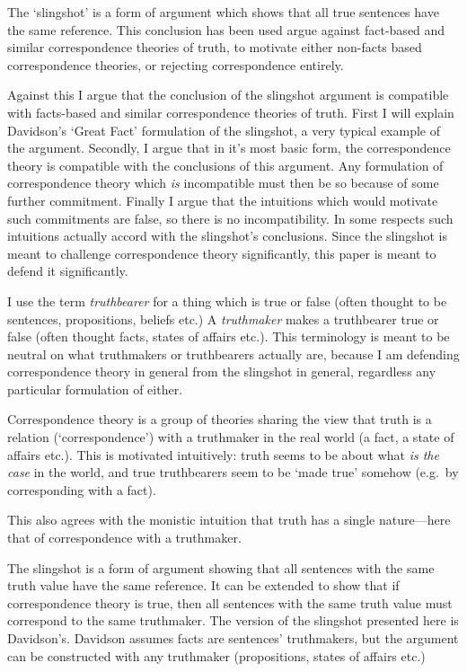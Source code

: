 The `slingshot' is a form of argument which shows that all true sentences have the same reference.
This conclusion has been used argue against fact-based and similar correspondence theories of truth, to motivate either non-facts based correspondence theories, or rejecting correspondence entirely.

Against this I argue that the conclusion of the slingshot argument is compatible with facts-based and similar correspondence theories of truth.
First I will explain Davidson's `Great Fact' formulation of the slingshot, a very typical example of the argument.
Secondly, I argue that in it's most basic form, the correspondence theory is compatible with the conclusions of this argument.
Any formulation of correspondence theory which \emph{is} incompatible must then be so because of some further commitment.
Finally I argue that the intuitions which would motivate such commitments are false, so there is no incompatibility.
In some respects such intuitions actually accord with the slingshot's conclusions.
Since the slingshot is meant to challenge correspondence theory significantly, this paper is meant to defend it significantly.

I use the term \textit{truthbearer} for a thing which is true or false (often thought to be sentences, propositions, beliefs etc.)
A \textit{truthmaker} makes a truthbearer true or false (often thought facts, states of affairs etc.).
This terminology is meant to be neutral on what truthmakers or truthbearers actually are, because I am defending correspondence theory in general from the slingshot in general, regardless any particular formulation of either.

Correspondence theory is a group of theories sharing the view that truth is a relation (`correspondence') with a truthmaker in the real world (a fact, a state of affairs etc.).
This is motivated intuitively: truth seems to be about what \emph{is the case} in the world, and true truthbearers seem to be `made true' somehow (e.g.\ by corresponding with a fact).

This also agrees with the monistic intuition that truth has a single nature---here that of correspondence with a truthmaker.

The slingshot is a form of argument showing that all sentences with the same truth value have the same reference. %
It can be extended to show that if correspondence theory is true, then all sentences with the same truth value must correspond to the same truthmaker.
The version of the slingshot presented here is Davidson's.
\parencite[753]{Davidson_1969}
Davidson assumes facts are sentences' truthmakers, but the argument can be constructed with any truthmaker (propositions, states of affairs etc.)
\parencite[752]{Davidson_1969}

